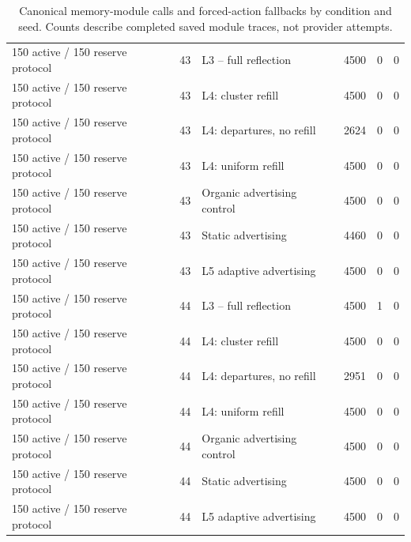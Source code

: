 \begin{table}[htbp!]
\begin{tabular}{lrlrrr}
150 active / 150 reserve protocol & 43 & L3 -- full reflection & 4500 & 0 & 0 \\
150 active / 150 reserve protocol & 43 & L4: cluster refill & 4500 & 0 & 0 \\
150 active / 150 reserve protocol & 43 & L4: departures, no refill & 2624 & 0 & 0 \\
150 active / 150 reserve protocol & 43 & L4: uniform refill & 4500 & 0 & 0 \\
150 active / 150 reserve protocol & 43 & Organic advertising control & 4500 & 0 & 0 \\
150 active / 150 reserve protocol & 43 & Static advertising & 4460 & 0 & 0 \\
150 active / 150 reserve protocol & 43 & L5 adaptive advertising & 4500 & 0 & 0 \\
150 active / 150 reserve protocol & 44 & L3 -- full reflection & 4500 & 1 & 0 \\
150 active / 150 reserve protocol & 44 & L4: cluster refill & 4500 & 0 & 0 \\
150 active / 150 reserve protocol & 44 & L4: departures, no refill & 2951 & 0 & 0 \\
150 active / 150 reserve protocol & 44 & L4: uniform refill & 4500 & 0 & 0 \\
150 active / 150 reserve protocol & 44 & Organic advertising control & 4500 & 0 & 0 \\
150 active / 150 reserve protocol & 44 & Static advertising & 4500 & 0 & 0 \\
150 active / 150 reserve protocol & 44 & L5 adaptive advertising & 4500 & 0 & 0 \\
\hline
\end{tabular}
\caption{Canonical memory-module calls and forced-action fallbacks by condition and seed. Counts describe completed saved module traces, not provider attempts.}
\label{chap:results:tab:rq3_memory_forced_actions_by_condition}
\end{table}
